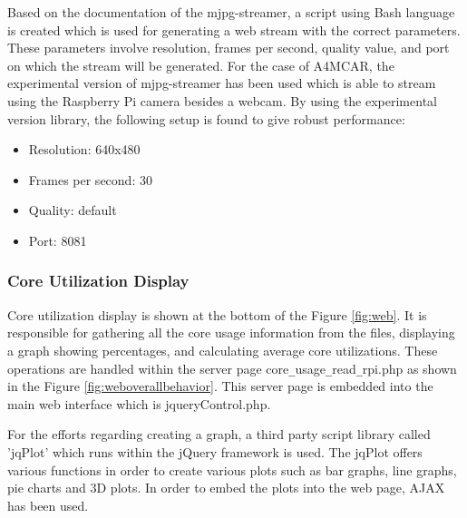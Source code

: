 Based on the documentation of the mjpg-streamer, a script using Bash language is created which is used for generating a web stream with the correct parameters. These parameters involve resolution, frames per second, quality value, and port on which the stream will be generated. For the case of A4MCAR, the experimental version of mjpg-streamer has been used which is able to stream using the Raspberry Pi camera besides a webcam. By using the experimental version library, the following setup is found to give robust performance:
\begin{itemize}
	\item Resolution:        640x480
	\item Frames per second: 30
	\item Quality:           default
	\item Port:              8081
\end{itemize}
\subsubsection{Core Utilization Display}
Core utilization display is shown at the bottom of the Figure \ref{fig:web}. It is responsible for gathering all the core usage information from the files, displaying a graph showing percentages, and calculating average core utilizations. These operations are handled within the server page core\texttt{\_}usage\texttt{\_}read\texttt{\_}rpi.php as shown in the Figure \ref{fig:weboverallbehavior}. This server page is embedded into the main web interface which is jqueryControl.php.

For the efforts regarding creating a graph, a third party script library called 'jqPlot' \cite{jqplot} which runs within the jQuery framework is used.  The jqPlot offers various functions in order to create various plots such as bar graphs, line graphs, pie charts and 3D plots. In order to embed the plots into the web page, AJAX has been used.

